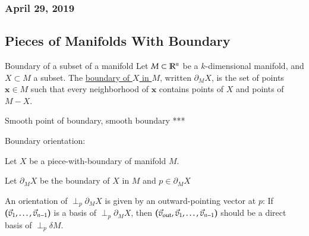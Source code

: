 \subsubsection*{April 29, 2019}

\subsection{Pieces of Manifolds With Boundary}

\begin{defn}{Boundary of a subset of a manifold}
	Let $M\subset \mathbb{R}^n$ be a $k$-dimensional manifold, and $X\subset M$ a subset. The \ul{boundary of $X$ in $M$}, written $\partial_M X$, is the set of points $\bm{x}\in M$ such that every neighborhood of $\bm{x}$ contains points of $X$ and points of $M-X$. 
\end{defn}

\begin{defn}{Smooth point of boundary, smooth boundary}
	***
\end{defn}

Boundary orientation: 

Let $X$ be a piece-with-boundary of manifold $M$.

Let $\partial_M X$ be the boundary of $X$ in $M$ and $p\in\partial_M X$

An orientation of $\perp_p\partial_M X$ is given by an outward-pointing vector at $p$: If $\left( \vec{v}_1, \dots, \vec{v}_{n-1} \right)$ is a basis of $\perp_p\partial_M X$, then $\left( \vec{v}_{\mathrm{out}},\vec{v}_1, \dots, \vec{v}_{n-1} \right)$ should be a direct basis of $\perp_p\delta M$. 
